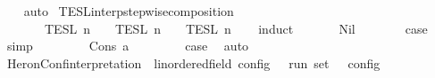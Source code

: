 \begin{isabellebody}
%
\isadelimproof
\ \ %
\endisadelimproof
%
\isatagproof
{}\isamarkupfalse%
\ auto%
\endisatagproof
{\isafoldproof}%
%
\isadelimproof
\isanewline
%
\endisadelimproof
\isanewline
{}\isamarkupfalse%
\ TESL{\isacharunderscore}interp{\isacharunderscore}stepwise{\isacharunderscore}composition{\isacharcolon}\isanewline
\ \ \ {\isacartoucheopen}{\isasymlbrakk}{\isasymlbrakk}\ {\isasymPhi}\ {\isacharat}\ {\isasymPhi}\ {\isasymrbrakk}{\isasymrbrakk}\isactrlsub T\isactrlsub E\isactrlsub S\isactrlsub L\isactrlbsup {\isasymge}\ n\isactrlesup \ {\isacharequal}\ {\isasymlbrakk}{\isasymlbrakk}\ {\isasymPhi}\ {\isasymrbrakk}{\isasymrbrakk}\isactrlsub T\isactrlsub E\isactrlsub S\isactrlsub L\isactrlbsup {\isasymge}\ n\isactrlesup \ {\isasyminter}\ {\isasymlbrakk}{\isasymlbrakk}\ {\isasymPhi}\ {\isasymrbrakk}{\isasymrbrakk}\isactrlsub T\isactrlsub E\isactrlsub S\isactrlsub L\isactrlbsup {\isasymge}\ n\isactrlesup {\isacartoucheclose}\isanewline
%
\isadelimproof
\ \ %
\endisadelimproof
%
\isatagproof
{}\isamarkupfalse%
\ {\isacharparenleft}induct\ {\isasymPhi}\isanewline
\ \ \ \ \isamarkupfalse%
\ Nil\isanewline
\ \ \ \ \isamarkupfalse%
\ \isamarkupfalse%
\ {\isacharquery}case\ \isamarkupfalse%
\ simp\isanewline
\ \ \isamarkupfalse%
\isanewline
\ \ \ \ \isamarkupfalse%
\ {\isacharparenleft}Cons\ a\ {\isasymPhi}\isanewline
\ \ \ \ \isamarkupfalse%
\ \isamarkupfalse%
\ {\isacharquery}case\ \isamarkupfalse%
\ auto\isanewline
\ \ \isamarkupfalse%
%
\endisatagproof
{\isafoldproof}%
%
\isadelimproof
%
\endisadelimproof
%
\isadelimdocument
%
\endisadelimdocument
%
\isatagdocument
%
\isamarkuptrue%
%
\endisatagdocument
{\isafolddocument}%
%
\isadelimdocument
%
\endisadelimdocument
{}\isamarkupfalse%
\ HeronConf{\isacharunderscore}interpretation\ {\isacharcolon}{\isacharcolon}\ {\isacartoucheopen}{\isacharprime}{\isasymtau}{\isacharcolon}{\isacharcolon}linordered{\isacharunderscore}field\ config\ {\isasymRightarrow}\ {\isacharprime}{\isasymtau}\ run\ set{\isacartoucheclose}\ {\isacharparenleft}{\isachardoublequoteopen}{\isasymlbrakk}\ {\isacharunderscore}\ {\isasymrbrakk}\isactrlsub c\isactrlsub o\isactrlsub n\isactrlsub f\isactrlsub i\isactrlsub g{\isachardoublequoteclose}\ {}{}{\isacharparenright}\ \isanewline

\end{isabellebody}
